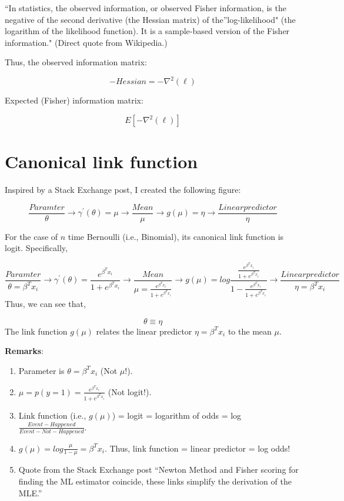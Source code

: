 \documentclass[
]{book}
\begin{document}
``In statistics, the observed information, or observed Fisher information, is the negative of the second derivative (the Hessian matrix) of the''log-likelihood" (the logarithm of the likelihood function). It is a sample-based version of the Fisher information." (Direct quote from Wikipedia.)

Thus, the observed information matrix:

\[-Hessian=-\nabla ^2(\ell) \]

Expected (Fisher) information matrix:

\[E[-\nabla ^2(\ell)] \]

\hypertarget{canonical-link-function}{%
\chapter{Canonical link function}\label{canonical-link-function}}

Inspired by a Stack Exchange post, I created the following figure:

\[ \frac{Paramter}{\theta} \longrightarrow \gamma^{'}(\theta) = \mu \longrightarrow \frac{Mean}{\mu} \longrightarrow g(\mu) = \eta \longrightarrow \frac{ Linear predictor}{\eta} \]

For the case of \(n\) time Bernoulli (i.e., Binomial), its canonical link function is logit. Specifically,

\[ \frac{Paramter}{\theta=\beta^Tx_i}  \longrightarrow \gamma^{'}(\theta)= \frac{e^{\beta^Tx_i}}{1+e^{\beta^Tx_i}}\longrightarrow \frac{Mean}{\mu=\frac{e^{\beta^Tx_i}}{1+e^{\beta^Tx_i}}}\longrightarrow g(\mu) = log \frac{\frac{e^{\beta^Tx_i}}{1+e^{\beta^Tx_i}}}{1-\frac{e^{\beta^Tx_i}}{1+e^{\beta^Tx_i}}}\longrightarrow \frac{ Linear predictor}{\eta = \beta^Tx_i}\]
Thus, we can see that,

\[\theta \equiv \eta \]
The link function \(g(\mu)\) relates the linear predictor \(\eta = \beta^Tx_i\) to the mean \(\mu\).

\textbf{Remarks}:

\begin{enumerate}
\def\labelenumi{(\arabic{enumi})}
\item
  Parameter is \(\theta = \beta ^T x_i\) (Not \(\mu\)!).
\item
  \(\mu=p(y=1)=\frac{e^{\beta^Tx_i}}{1+e^{\beta^Tx_i}}\) (Not logit!).
\item
  Link function (i.e., \(g(\mu)\)) = logit = logarithm of odds = log \(\frac{Event - Happened }{Event - Not - Happened}\).
\item
  \(g(\mu) = log \frac{\mu}{1-\mu}=\beta^T x_i\). Thus, link function = linear predictor = log odds!
\item
  Quote from the Stack Exchange post ``Newton Method and Fisher scoring for finding the ML estimator coincide, these links simplify the derivation of the MLE.''
\end{enumerate}
\end{document}
